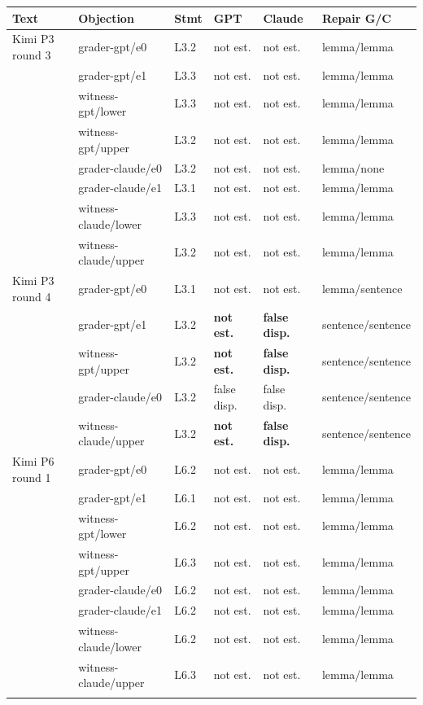 \begin{tabular}{@{}llllll@{}}
\toprule
Text & Objection & Stmt & GPT & Claude & Repair G/C \\
\midrule
Kimi P3 round 3 & grader-gpt/e0 & L3.2 & not est. & not est. & lemma/lemma \\
 & grader-gpt/e1 & L3.3 & not est. & not est. & lemma/lemma \\
 & witness-gpt/lower & L3.3 & not est. & not est. & lemma/lemma \\
 & witness-gpt/upper & L3.2 & not est. & not est. & lemma/lemma \\
 & grader-claude/e0 & L3.2 & not est. & not est. & lemma/none \\
 & grader-claude/e1 & L3.1 & not est. & not est. & lemma/lemma \\
 & witness-claude/lower & L3.3 & not est. & not est. & lemma/lemma \\
 & witness-claude/upper & L3.2 & not est. & not est. & lemma/lemma \\
\addlinespace[2pt]
Kimi P3 round 4 & grader-gpt/e0 & L3.1 & not est. & not est. & lemma/sentence \\
 & grader-gpt/e1 & L3.2 & \textbf{not est.} & \textbf{false disp.} & sentence/sentence \\
 & witness-gpt/upper & L3.2 & \textbf{not est.} & \textbf{false disp.} & sentence/sentence \\
 & grader-claude/e0 & L3.2 & false disp. & false disp. & sentence/sentence \\
 & witness-claude/upper & L3.2 & \textbf{not est.} & \textbf{false disp.} & sentence/sentence \\
\addlinespace[2pt]
Kimi P6 round 1 & grader-gpt/e0 & L6.2 & not est. & not est. & lemma/lemma \\
 & grader-gpt/e1 & L6.1 & not est. & not est. & lemma/lemma \\
 & witness-gpt/lower & L6.2 & not est. & not est. & lemma/lemma \\
 & witness-gpt/upper & L6.3 & not est. & not est. & lemma/lemma \\
 & grader-claude/e0 & L6.2 & not est. & not est. & lemma/lemma \\
 & grader-claude/e1 & L6.2 & not est. & not est. & lemma/lemma \\
 & witness-claude/lower & L6.2 & not est. & not est. & lemma/lemma \\
 & witness-claude/upper & L6.3 & not est. & not est. & lemma/lemma \\
\addlinespace[2pt]

\end{tabular}
